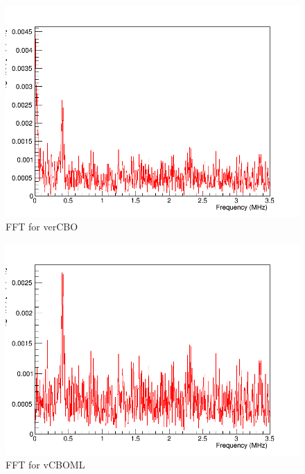 \begin{figure}[ht]
\centering 
\includegraphics[scale=0.5]{Figures/verCBO_fft.png}
\decoRule
\caption{FFT for verCBO}
\label{fig:verCBO_fft}
\end{figure}

\begin{figure}[ht]
\centering 
\includegraphics[scale=0.5]{Figures/vCBOML_fft.png}
\decoRule
\caption{FFT for vCBOML}
\label{fig:vCBOML_fft}
\end{figure}

